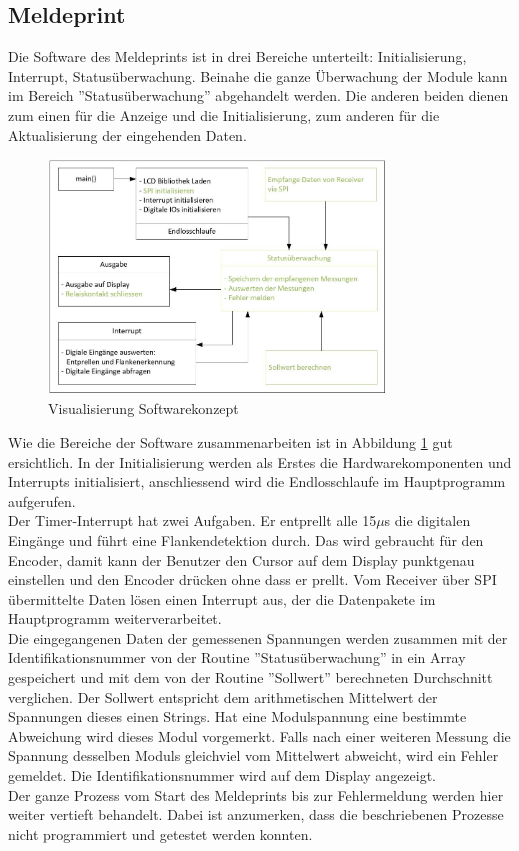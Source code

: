 \subsection{Meldeprint}
Die Software des Meldeprints ist in drei Bereiche unterteilt: Initialisierung, Interrupt, Statusüberwachung. Beinahe die ganze Überwachung der Module kann im Bereich ''Statusüberwachung'' abgehandelt werden. Die anderen beiden dienen zum einen für die Anzeige und die Initialisierung, zum anderen für die Aktualisierung der eingehenden Daten.

\begin{figure}[htbp] 
  \centering
     \includegraphics[width=0.8\textwidth]{graphics/reportboard-software-river}
  \caption{Visualisierung Softwarekonzept}
  \label{fig:reportboard-software-river}
\end{figure}

Wie die Bereiche der Software zusammenarbeiten ist in Abbildung \ref{fig:reportboard-software-river} gut ersichtlich. In der Initialisierung werden als Erstes die Hardwarekomponenten  und Interrupts initialisiert, anschliessend wird die Endlosschlaufe im Hauptprogramm aufgerufen.\\
Der Timer-Interrupt hat zwei Aufgaben. Er entprellt alle 15$\mu$s die digitalen Eingänge und führt eine Flankendetektion durch. Das wird gebraucht für den Encoder, damit kann der Benutzer den Cursor auf dem Display punktgenau einstellen und den Encoder drücken ohne dass er prellt. Vom Receiver über SPI übermittelte Daten lösen einen Interrupt aus, der die Datenpakete im Hauptprogramm weiterverarbeitet.\\
Die eingegangenen Daten der gemessenen Spannungen werden zusammen mit der Identifikationsnummer von der Routine ''Statusüberwachung'' in ein Array gespeichert und mit dem von der Routine ''Sollwert'' berechneten Durchschnitt verglichen. Der Sollwert entspricht dem arithmetischen Mittelwert der Spannungen dieses einen Strings. Hat eine Modulspannung eine bestimmte Abweichung wird dieses Modul vorgemerkt. Falls nach einer weiteren Messung die Spannung desselben Moduls gleichviel vom Mittelwert abweicht, wird ein Fehler gemeldet. Die Identifikationsnummer wird auf dem Display angezeigt.\\
Der ganze Prozess vom Start des Meldeprints bis zur Fehlermeldung werden hier weiter vertieft behandelt. Dabei ist anzumerken, dass die beschriebenen Prozesse nicht programmiert und getestet werden konnten.
